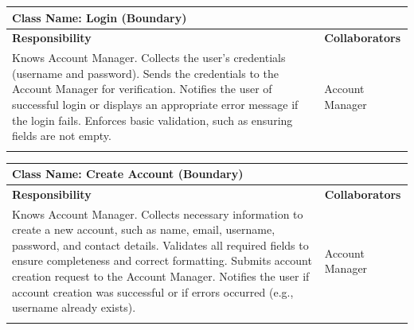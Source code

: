 \documentclass[]{article}
\begin{document}
	\begin{table}[H]
		\centering
		\begin{tabular}{|p{8cm}|p{8cm}|}
		\hline 
		\multicolumn{2}{|l|}{\textbf{Class Name:} Login (Boundary)} \\
		\hline
		\textbf{Responsibility} & \textbf{Collaborators} \\
		\hline
		Knows Account Manager. \newline
		Collects the user's credentials (username and password). \newline
		Sends the credentials to the Account Manager for verification. \newline
		Notifies the user of successful login or displays an appropriate error message if the login fails. \newline
		Enforces basic validation, such as ensuring fields are not empty. 
		& Account Manager \\
		\vspace{1in} & \\
		\hline
		\end{tabular}
	\end{table}

	\begin{table}[H]
		\centering
		\begin{tabular}{|p{8cm}|p{8cm}|}
		\hline 
		\multicolumn{2}{|l|}{\textbf{Class Name:} Create Account (Boundary)} \\
		\hline
		\textbf{Responsibility} & \textbf{Collaborators} \\
		\hline
		Knows Account Manager. \newline
		Collects necessary information to create a new account, such as name, email, username, password, and contact details. \newline
		Validates all required fields to ensure completeness and correct formatting. \newline
		Submits account creation request to the Account Manager. \newline
		Notifies the user if account creation was successful or if errors occurred (e.g., username already exists). 
		& Account Manager \\
		\vspace{1in} & \\
		\hline
		\end{tabular}
	\end{table}
\end{document}
